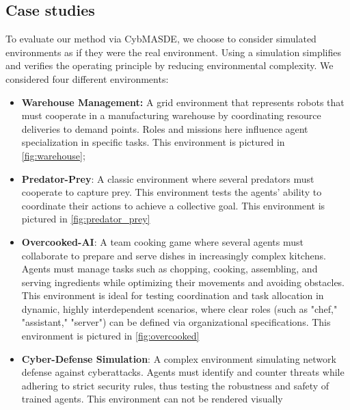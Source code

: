\documentclass[pdflatex,sn-mathphys-num]{sn-jnl}%
\theoremstyle{thmstyleone}%
\theoremstyle{thmstyletwo}%
\theoremstyle{thmstylethree}%
\begin{document}
\subsection{Case studies}
To evaluate our method via CybMASDE, we choose to consider simulated environments as if they were the real environment.
Using a simulation simplifies and verifies the operating principle by reducing environmental complexity. We considered four different environments:
%
\begin{itemize}
    \item \textbf{Warehouse Management:} A grid environment that represents robots that must cooperate in a manufacturing warehouse by coordinating resource deliveries to demand points. Roles and missions here influence agent specialization in specific tasks. This environment is pictured in \autoref{fig:warehouse};

    \item \textbf{Predator-Prey}: A classic environment where several predators must cooperate to capture prey. This environment tests the agents' ability to coordinate their actions to achieve a collective goal\cite{lowe2017multi}. This environment is pictured in \autoref{fig:predator_prey}

    \item \textbf{Overcooked-AI}: A team cooking game where several agents must collaborate to prepare and serve dishes in increasingly complex kitchens\cite{overcookedai}. Agents must manage tasks such as chopping, cooking, assembling, and serving ingredients while optimizing their movements and avoiding obstacles. This environment is ideal for testing coordination and task allocation in dynamic, highly interdependent scenarios, where clear roles (such as "chef," "assistant," "server") can be defined via organizational specifications. This environment is pictured in \autoref{fig:overcooked}
    
    \item \textbf{Cyber-Defense Simulation}: A complex environment simulating network defense against cyberattacks. Agents must identify and counter threats while adhering to strict security rules, thus testing the robustness and safety of trained agents\cite{Maxwell2021}. This environment can not be rendered visually
\end{itemize}
\end{document}

